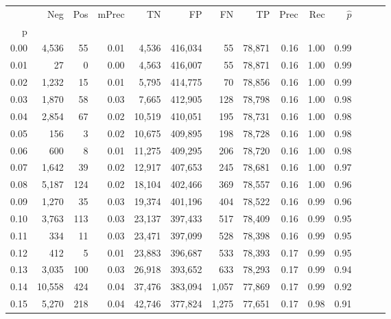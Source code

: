 \begin{tabular}{rrrrrrrrrrrrrr}
\toprule
{} &     Neg &    Pos & mPrec &       TN &       FP &      FN &      TP &  Prec &   Rec & $\hat{p}$ \\
p    &         &        &       &          &          &         &         &       &       &           \\
\midrule
0.00 &   4,536 &     55 &  0.01 &    4,536 &  416,034 &      55 &  78,871 &  0.16 &  1.00 &      0.99 \\
0.01 &      27 &      0 &  0.00 &    4,563 &  416,007 &      55 &  78,871 &  0.16 &  1.00 &      0.99 \\
0.02 &   1,232 &     15 &  0.01 &    5,795 &  414,775 &      70 &  78,856 &  0.16 &  1.00 &      0.99 \\
0.03 &   1,870 &     58 &  0.03 &    7,665 &  412,905 &     128 &  78,798 &  0.16 &  1.00 &      0.98 \\
0.04 &   2,854 &     67 &  0.02 &   10,519 &  410,051 &     195 &  78,731 &  0.16 &  1.00 &      0.98 \\
0.05 &     156 &      3 &  0.02 &   10,675 &  409,895 &     198 &  78,728 &  0.16 &  1.00 &      0.98 \\
0.06 &     600 &      8 &  0.01 &   11,275 &  409,295 &     206 &  78,720 &  0.16 &  1.00 &      0.98 \\
0.07 &   1,642 &     39 &  0.02 &   12,917 &  407,653 &     245 &  78,681 &  0.16 &  1.00 &      0.97 \\
0.08 &   5,187 &    124 &  0.02 &   18,104 &  402,466 &     369 &  78,557 &  0.16 &  1.00 &      0.96 \\
0.09 &   1,270 &     35 &  0.03 &   19,374 &  401,196 &     404 &  78,522 &  0.16 &  0.99 &      0.96 \\
0.10 &   3,763 &    113 &  0.03 &   23,137 &  397,433 &     517 &  78,409 &  0.16 &  0.99 &      0.95 \\
0.11 &     334 &     11 &  0.03 &   23,471 &  397,099 &     528 &  78,398 &  0.16 &  0.99 &      0.95 \\
0.12 &     412 &      5 &  0.01 &   23,883 &  396,687 &     533 &  78,393 &  0.17 &  0.99 &      0.95 \\
0.13 &   3,035 &    100 &  0.03 &   26,918 &  393,652 &     633 &  78,293 &  0.17 &  0.99 &      0.94 \\
0.14 &  10,558 &    424 &  0.04 &   37,476 &  383,094 &   1,057 &  77,869 &  0.17 &  0.99 &      0.92 \\
0.15 &   5,270 &    218 &  0.04 &   42,746 &  377,824 &   1,275 &  77,651 &  0.17 &  0.98 &      0.91 \\

\end{tabular}
